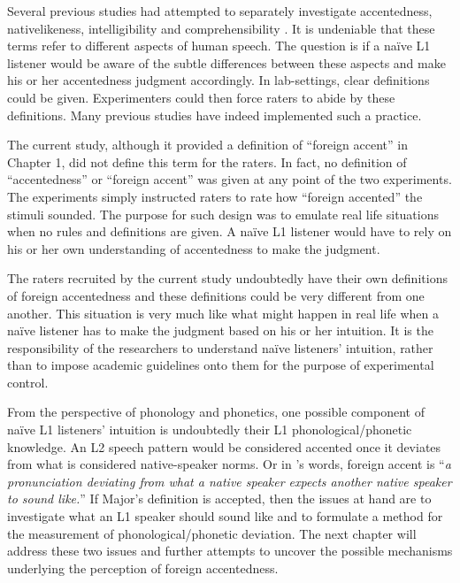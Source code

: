Several previous studies had attempted to separately investigate accentedness, nativelikeness, intelligibility and comprehensibility \citep{Derwing_1997,Kennedy_2008,McCullough_2013}. It is undeniable that these terms refer to different aspects of human speech. The question is if a naïve L1 listener would be aware of the subtle differences between these aspects and make his or her accentedness judgment accordingly. In lab-settings, clear definitions could be given. Experimenters could then force raters to abide by these definitions. Many previous studies have indeed implemented such a practice. 

The current study, although it provided a definition of “foreign accent” in Chapter 1, did not define this term for the raters. In fact, no definition of “accentedness” or “foreign accent” was given at any point of the two experiments. The experiments simply instructed raters to rate how “foreign accented” the stimuli sounded. The purpose for such design was to emulate real life situations when no rules and definitions are given. A naïve L1 listener would have to rely on his or her own understanding of accentedness to make the judgment. 

The raters recruited by the current study undoubtedly have their own definitions of foreign accentedness and these definitions could be very different from one another. This situation is very much like what might happen in real life when a naïve listener has to make the judgment based on his or her intuition. It is the responsibility of the researchers to understand naïve listeners’ intuition, rather than to impose academic guidelines onto them for the purpose of experimental control. 

From the perspective of phonology and phonetics, one possible component of naïve L1 listeners’ intuition is undoubtedly their L1 phonological/phonetic knowledge. An L2 speech pattern would be considered accented once it deviates from what is considered native-speaker norms. Or in \citet[p.1]{Major_2012}’s words, foreign accent is “\textit{a pronunciation deviating from what a native speaker expects another native speaker to sound like.}” If Major’s definition is accepted, then the issues at hand are to investigate what an L1 speaker should sound like and to formulate a method for the measurement of phonological/phonetic deviation. The next chapter will address these two issues and further attempts to uncover the possible mechanisms underlying the perception of foreign accentedness. 






